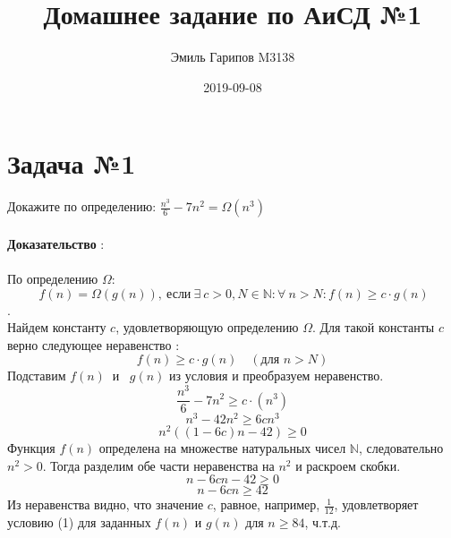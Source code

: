 \documentclass{article}
\title{Домашнее задание по АиСД №1}
\date{2019-09-08}
\author{Эмиль Гарипов M3138}
\begin{document}

\maketitle
\newpage
{}

\section*{Задача №1}
Докажите по определению: $ \frac{n^{3}}{6} - 7n^{2} = \Omega(n^{3}) $ 
\\\\
\textbf{Доказательство} :
\\\\
По определению $\Omega :$ $$\ f(n) = \Omega(g(n)), \  \text{если} \ \exists \ c > 0, N \in \mathbb{N} : \forall \ n > N : f(n) \geq c \cdot g(n)$$.
\\
Найдем константу $c$, удовлетворяющую определению $\Omega$.
Для такой константы $c$ верно следующее неравенство :
\begin{equation}
f(n) \geq c \cdot g(n) \quad (\text{для }n > N)
\end{equation}
Подставим $f(n) \ $ и \ $g(n)$ из условия и преобразуем неравенство.
$$ \frac{n^{3}}{6} - 7n^{2} \geq c \cdot (n ^ {3})$$
$$ n^{3} - 42n ^ {2} \geq 6cn^{3}$$
$$ n^{2}((1 - 6c)n - 42) \geq 0 $$
Функция $f(n)$ определена на множестве натуральных чисел $\mathbb{N}$, следовательно $n^{2} > 0$. Тогда разделим обе части неравенства на $n^{2}$ и раскроем скобки.
$$ n - 6cn - 42 \geq 0$$
$$ n - 6cn \geq 42 $$
Из неравенства видно, что значение $c$, равное, например, $\frac{1}{12}$, удовлетворяет условию (1) для заданных $f(n)$ и $g(n)$ для $n \geq 84$, ч.т.д.
\end{document}
